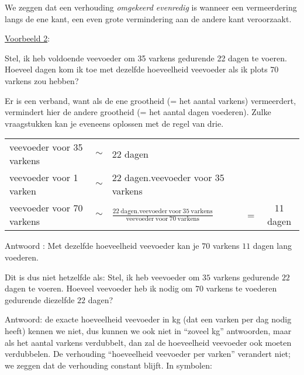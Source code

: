We zeggen dat een verhouding \emph{omgekeerd evenredig} is wanneer
een vermeerdering langs de ene kant, een even grote vermindering aan
de andere kant veroorzaakt. 

\medskip{}


\uline{Voorbeeld 2}: 

Stel, ik heb voldoende veevoeder om 35 varkens gedurende 22 dagen
te voeren. Hoeveel dagen kom ik toe met dezelfde hoeveelheid veevoeder
als ik plots 70 varkens zou hebben?

Er is een verband, want als de ene grootheid (= het aantal varkens)
vermeerdert, vermindert hier de andere grootheid (= het aantal dagen
voederen). Zulke vraagstukken kan je eveneens oplossen met de regel
van drie. \medskip{}



\begin{tabular}{lclcc}
veevoeder voor 35 varkens & $\sim$ & 22 dagen &  & \\
veevoeder voor 1 varken & $\sim$ & 22 dagen.veevoeder voor 35 varkens &  & \\
veevoeder voor 70 varkens & $\sim$ & $\frac{22\:\mathrm{dagen}.\mathrm{veevoeder\:voor}\:35\:\mathrm{varkens}}{\mathrm{veevoeder\:voor}\:70\:\mathrm{varkens}}$ & = & 11 dagen\\
\end{tabular}

Antwoord : Met dezelfde hoeveelheid veevoeder kan je $70$ varkens $11$
dagen lang voederen. \bigskip{}


Dit is dus niet hetzelfde als: Stel, ik heb veevoeder om $35$ varkens
gedurende $22$ dagen te voeren. Hoeveel veevoeder heb ik nodig om $70$
varkens te voederen gedurende diezelfde $22$ dagen?

Antwoord: de exacte hoeveelheid veevoeder in kg (dat een varken per
dag nodig heeft) kennen we niet, dus kunnen we ook niet in ``zoveel
kg'' antwoorden, maar als het aantal varkens verdubbelt, dan zal
de hoeveelheid veevoeder ook moeten verdubbelen. De verhouding ``hoeveelheid
veevoeder per varken'' verandert niet; we zeggen dat de verhouding
constant blijft. In symbolen:

